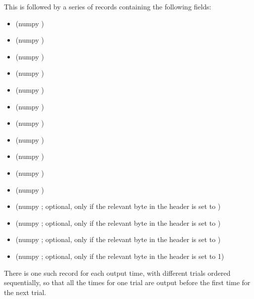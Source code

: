 \documentclass[letterpaper,10pt,english]{sphinxmanual}
\begin{document}
This is followed by a series of records containing the following fields:
\begin{itemize}
\item {} 
 (numpy )

\item {} 
 (numpy )

\item {} 
 (numpy )

\item {} 
 (numpy )

\item {} 
 (numpy )

\item {} 
 (numpy )

\item {} 
 (numpy )

\item {} 
 (numpy )

\item {} 
 (numpy )

\item {} 
 (numpy )

\item {} 
 (numpy )

\item {} 
 (numpy ; optional, only if the relevant byte
in the header is set to )

\item {} 
 (numpy ; optional, only if the relevant byte
in the header is set to )

\item {} 
 (numpy ; optional, only if the relevant byte
in the header is set to )

\item {} 
 (numpy ; optional, only if the relevant byte
in the header is set to 1)

\end{itemize}

There is one such record for each output time, with different trials
ordered sequentially, so that all the times for one trial are output
before the first time for the next trial.
\end{document}
